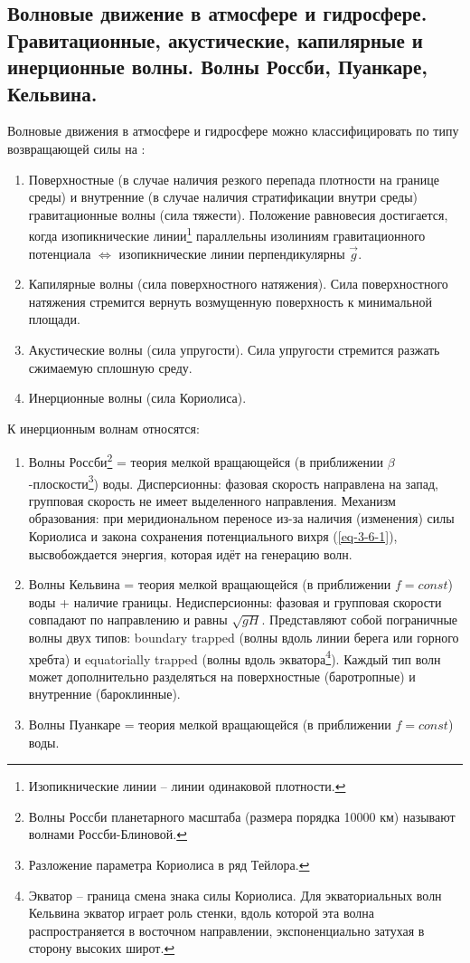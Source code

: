 \subsection{Волновые движение в атмосфере и гидросфере. Гравитационные, акустические, капилярные и инерционные волны. Волны Россби, Пуанкаре, Кельвина.}
Волновые движения в атмосфере и гидросфере можно классифицировать по типу возвращающей силы на \cite{Носов-2019-13}:
\begin{enumerate}
\item Поверхностные (в случае наличия резкого перепада плотности на границе среды) и внутренние (в случае наличия стратификации внутри среды) гравитационные волны (сила тяжести). Положение равновесия достигается, когда изопикнические линии\footnote{Изопикнические линии -- линии одинаковой плотности.} параллельны изолиниям гравитационного потенциала $\Leftrightarrow$ изопикнические линии перпендикулярны $\vec{g}$.
\item Капилярные волны (сила поверхностного натяжения). Сила поверхностного натяжения стремится вернуть возмущенную поверхность к минимальной площади.
\item Акустические волны (сила упругости). Сила упругости стремится разжать сжимаемую сплошную среду.
\item Инерционные волны (сила Кориолиса).
\end{enumerate}
К инерционным волнам относятся:
\begin{enumerate}
\item Волны Россби\footnote{Волны Россби планетарного масштаба (размера порядка 10000 км) называют волнами Россби-Блиновой.} = теория мелкой вращающейся (в приближении $\beta$-плоскости\footnote{Разложение параметра Кориолиса в ряд Тейлора.}) воды. Дисперсионны: фазовая скорость направлена на запад, групповая скорость не имеет выделенного направления. Механизм образования: при меридиональном переносе из-за наличия (изменения) силы Кориолиса и закона сохранения потенциального вихря (\ref{eq-3-6-1}), высвобождается энергия, которая идёт на генерацию волн.
\item Волны Кельвина = теория мелкой вращающейся (в приближении $f=const$) воды + наличие границы. Недисперсионны: фазовая и групповая скорости совпадают по направлению и равны $\sqrt{gH}$. Представляют собой пограничные волны двух типов: boundary trapped (волны вдоль линии берега или горного хребта) и equatorially trapped (волны вдоль экватора\footnote{Экватор -- граница смена знака силы Кориолиса. Для экваториальных волн Кельвина экватор играет роль стенки, вдоль которой эта волна распространяется в восточном направлении, экспоненциально затухая в сторону высоких широт.}). Каждый тип волн может дополнительно разделяться на поверхностные (баротропные) и внутренние (бароклинные).
\item Волны Пуанкаре = теория мелкой вращающейся (в приближении $f=const$) воды.
\end{enumerate}
